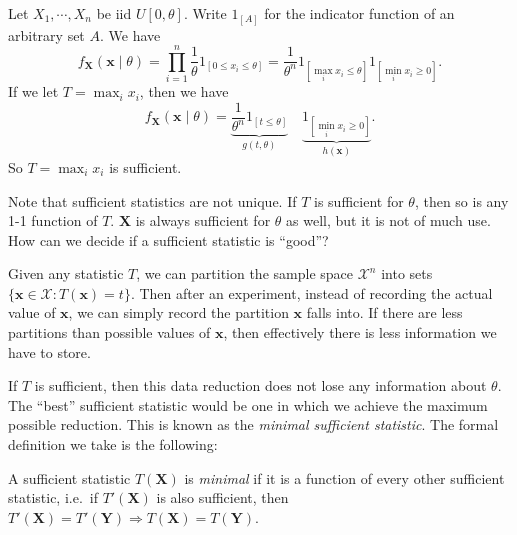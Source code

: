 \documentclass[a4paper]{article}
\begin{document}
\begin{eg}
  Let $X_1, \cdots, X_n$ be iid $U[0, \theta]$. Write $1_{[A]}$ for the indicator function of an arbitrary set $A$. We have
  \[
    f_\mathbf{X}(\mathbf{x}\mid \theta) = \prod_{i = 1}^n \frac{1}{\theta}1_{[0 \leq x_i\leq \theta]} = \frac{1}{\theta^n}1_{[\max_i x_i \leq \theta]}1_{[\min_i x_i\geq 0]}.
  \]
  If we let $T = \max_i x_i$, then we have
  \[
    f_\mathbf{X}(\mathbf{x}\mid \theta) = \underbrace{\frac{1}{\theta^n}1_{[t \leq \theta]}}_{g(t, \theta)}\quad \underbrace{1_{[\min_i x_i \geq 0]}}_{h(\mathbf{x})}.
  \]
  So $T = \max_i x_i$ is sufficient.
\end{eg}

Note that sufficient statistics are not unique. If $T$ is sufficient for $\theta$, then so is any 1-1 function of $T$. $\mathbf{X}$ is always sufficient for $\theta$ as well, but it is not of much use. How can we decide if a sufficient statistic is ``good''?

Given any statistic $T$, we can partition the sample space $\mathcal{X}^n$ into sets $\{\mathbf{x}\in \mathcal{X}: T(\mathbf{x}) = t\}$. Then after an experiment, instead of recording the actual value of $\mathbf{x}$, we can simply record the partition $\mathbf{x}$ falls into. If there are less partitions than possible values of $\mathbf{x}$, then effectively there is less information we have to store.

If $T$ is sufficient, then this data reduction does not lose any information about $\theta$. The ``best'' sufficient statistic would be one in which we achieve the maximum possible reduction. This is known as the \emph{minimal sufficient statistic}. The formal definition we take is the following:

\begin{defi}
  A sufficient statistic $T(\mathbf{X})$ is \emph{minimal} if it is a function of every other sufficient statistic, i.e.\ if $T'(\mathbf{X})$ is also sufficient, then $T'(\mathbf{X}) = T'(\mathbf{Y}) \Rightarrow T(\mathbf{X}) = T(\mathbf{Y})$.
\end{defi}
\end{document}
